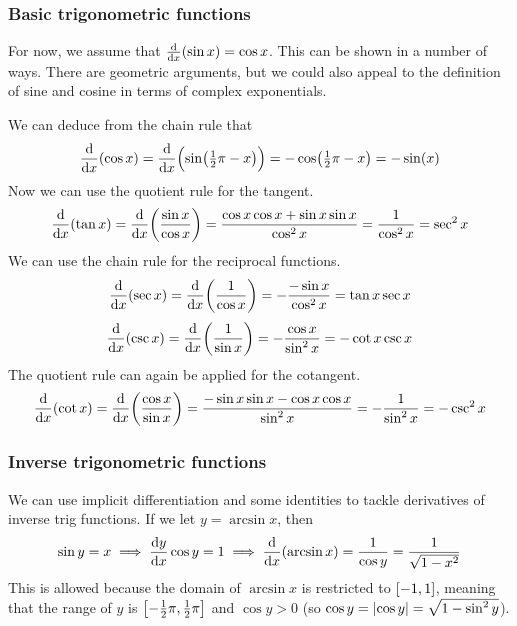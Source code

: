 \documentclass[fleqn,a4paper,11pt]{article}
\begin{document}
    \subsubsection{Basic trigonometric functions} \label{sec_calc_trig_basic}


    For now, we assume that \(\dv{x}(\sin x) = \cos x\). This can
    be shown in a number of ways. There are geometric arguments, but we could
    also appeal to the definition of sine and cosine in terms of complex
    exponentials.

    We can deduce from the chain rule that
    \begin{equation*}
    \dv{x}(\cos x) = \dv{x}(\sin(\tfrac 12 \pi - x))
        = -\cos(\tfrac 12 \pi - x) = -\sin(x)
    \end{equation*}
    Now we can use the quotient rule for the tangent.
    \begin{equation*}
    \dv{x}(\tan x) = \dv{x}(\frac{\sin x}{\cos x})
        = \frac{\cos x \cos x + \sin x \sin x}{\cos^2 x}
        = \frac 1{\cos^2 x} = \sec^2 x
    \end{equation*}
    We can use the chain rule for the reciprocal functions.
    \begin{equation*}
    \dv{x}(\sec x) = \dv{x}(\frac 1{\cos x}) = -\frac{-\sin x}{\cos^2 x}
        = \tan x \sec x
    \end{equation*}
    \begin{equation*}
    \dv{x}(\csc x) = \dv{x}(\frac 1{\sin x}) = -\frac{\cos x}{\sin^2 x}
        = -\cot x \csc x
    \end{equation*}
    The quotient rule can again be applied for the cotangent.
    \begin{equation*}
    \dv{x}(\cot x) = \dv{x}(\frac{\cos x}{\sin x})
        = \frac{-\sin x \sin x - \cos x \cos x}{\sin^2 x}
        = -\frac 1{\sin^2 x} = -\csc^2 x
    \end{equation*}

    \subsubsection{Inverse trigonometric functions} \label{sec_calc_trig_inv}

    We can use implicit differentiation and some identities to tackle
    derivatives of inverse trig functions. If we let \(y = \arcsin x\), then
    \begin{equation*}
    \sin y = x \implies \dv{y}{x} \cos y = 1
        \implies \dv{x}(\arcsin x) = \frac{1}{\cos y} = \frac{1}{\sqrt{1 - x^2}}
    \end{equation*}
    This is allowed because the domain of \(\arcsin x\) is restricted to
    \(\intcc{-1, 1}\), meaning that the range of \(y\) is
    \(\intcc{-\frac 12 \pi, \frac 12 \pi}\) and \(\cos y > 0\)
    (so \(\cos y = \abs{\cos y} = \sqrt{1 - \sin^2 y}\)).
\end{document}
